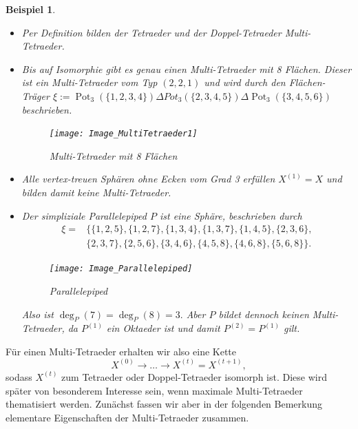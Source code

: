 \documentclass[12pt,titlepage,twoside,cleardoublepage]{article}
\theoremstyle{nummermitklammern}
\newtheorem{bsp}[temp]{Beispiel}
\newtheorem{bsp}[zahl]{Beispiel}
\numberwithin{equation}{section}
\DeclareMathOperator{\Pot}{Pot}
\begin{document}
\begin{bsp} \label{bspCactus}
\begin{itemize}
\item Per Definition bilden der Tetraeder und der Doppel-Tetraeder Multi-Tetraeder.
\item Bis auf Isomorphie gibt es genau einen Multi-Tetraeder mit 8 Flächen. Dieser ist ein Multi-Tetraeder vom Typ $(2,2,1)$ und wird durch den Flächen-Träger $\xi:=\Pot_3(\{1,2,3,4\})\Delta Pot_3(\{2,3,4,5\})\Delta \Pot_3(\{3,4,5,6\})$ beschrieben. 
\begin{figure}[H]
\begin{center}
\texttt{[image: Image\_MultiTetraeder1]}
\end{center}
\caption{Multi-Tetraeder mit 8 Flächen}
\end{figure}
\item Alle vertex-treuen Sphären ohne Ecken vom Grad 3 erfüllen $X^{(1)}=X$ und bilden damit keine Multi-Tetraeder.
\item Der simpliziale Parallelepiped $P$ ist eine Sphäre, beschrieben durch 
\begin{align*}
\xi=&\{ \{1, 2, 5 \}, \{ 1, 2, 7 \}, \{ 1, 3, 4 \}, \{ 1, 3, 7 \}, \{ 1, 4, 5 \},\{ 2, 3, 6 \},\\ &\{2, 3, 7 \}, 
\{ 2, 5, 6 \}, \{ 3, 4, 6 \}, \{ 4, 5, 8 \},\{ 4, 6, 8 \}, \{ 5, 6, 8 \} \}.
\end{align*}
\begin{figure}[H]
\begin{center}
\texttt{[image: Image\_Parallelepiped]}
\end{center}
\caption{Parallelepiped}
\end{figure}
Also ist $\deg_P(7)=\deg_P(8)=3.$ Aber $P$ bildet dennoch keinen Multi-Tetraeder, da $P^{(1)}$ ein Oktaeder ist und damit $P^{(2)}=P^{(1)}$ gilt.
\end{itemize}
\end{bsp}
Für einen Multi-Tetraeder erhalten wir also eine Kette 
\[
X^{(0)}\to \ldots \to X^{(t)}=X^{(t+1)},
\] 
sodass $X^{(t)}$ zum Tetraeder oder Doppel-Tetraeder isomorph ist.
Diese wird später von besonderem Interesse sein, wenn maximale Multi-Tetraeder thematisiert werden. Zunächst fassen wir aber in der folgenden Bemerkung elementare Eigenschaften der Multi-Tetraeder zusammen.
\end{document}
